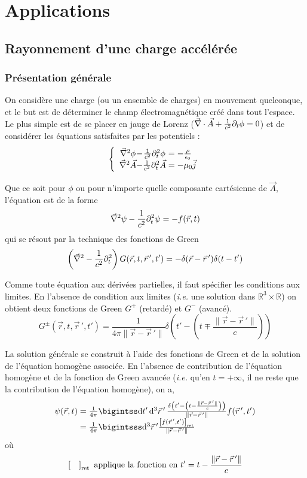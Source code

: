 \chapter{Applications}

\section{Rayonnement d'une charge accélérée}
\subsection{Présentation générale}

{\txt On considère une charge (ou un ensemble de charges) en mouvement quelconque, et le but est de déterminer le champ électromagnétique créé dans tout l'espace. Le plus simple est de se placer en jauge de Lorenz ($\vec{\nabla}\cdot\vec{A}+\frac{1}{c^2}\partial_t\phi=0$) et de considérer les équations satisfaites par les potentiels :}
$$
	\left\{ \begin{array}{c@{-}c@{\;}l}
		\nab^2\phi&\frac{1}{c^2}\partial_t^2\phi&=-\frac{\rho}{\epsilon_0}\\
		\nab^2\vec{A}&\frac{1}{c^2}\partial_t^2\vec{A}&=-\mu_0\vec{j}
	\end{array} \right.
$$

Que ce soit pour $\phi$ ou pour n'importe quelle composante cartésienne de $\vec{A}$, l'équation est de la forme
$$
	\vec{\nabla}^2\psi-\frac{1}{c^2}\partial_t^2\psi=-f(\vec{r},t)
$$
qui se résout par la technique des fonctions de Green
$$
	\left(\vec{\nabla}^2-\frac{1}{c^2}\partial_t^2\right)G(\vec{r},t,\vec{r}\,',t')=-\delta(\vec{r}-\vec{r}\,')\delta(t-t')
$$

Comme toute équation aux dérivées partielles, il faut spécifier les conditions aux limites. En l'absence de condition aux limites (\emph{i.e.} une solution dans $\mathbb{R}^3\times\mathbb{R}$) on obtient deux fonctions de Green $G^+$ (retardé) et $G^-$ (avancé).
$$
	G^\pm (\vec{r},t,\vec{r}\,',t')=\frac{1}{4\pi\|\vec{r}-\vec{r}\,'\|}\delta\left(t'-\left(t\mp\frac{\|\vec{r}-\vec{r}\,'\|}{c}\right)\right)
$$

La solution générale se construit à l'aide des fonctions de Green et de la solution de l'équation homogène associée. En l'absence de contribution de l'équation homogène et de la fonction de Green avancée (\emph{i.e.} qu'en $t=+\infty$, il ne reste que la contribution de l'équation homogène), on a,
$$
	\begin{array}{r@{\;}l}
		\psi(\vec{r},t)&=\frac{1}{4\pi}\bigintss \dif t'\,\dif^3 \vec{r}\,'\, 
		\frac{\delta\left(t'-\left(t-\frac{\|\vec{r}-\vec{r}\,'\|}{c}\right)\right)}
			{\|\vec{r}-\vec{r}\,'\|}
		f(\vec{r}\,',t')\\
		&=\frac{1}{4\pi}\bigintsss\dif^3\vec{r}\,'\frac{\left[f(\vec{r}\,',t')\right]_{\text{ret}}}{\|\vec{r}-\vec{r}\,'\|}
	\end{array}
$$
où
$$
	\left[\kern 1em\right]_{\text{ret}} \text{ applique la fonction en } t'=t-\frac{\|\vec{r}-\vec{r}\,'\|}{c}
$$

